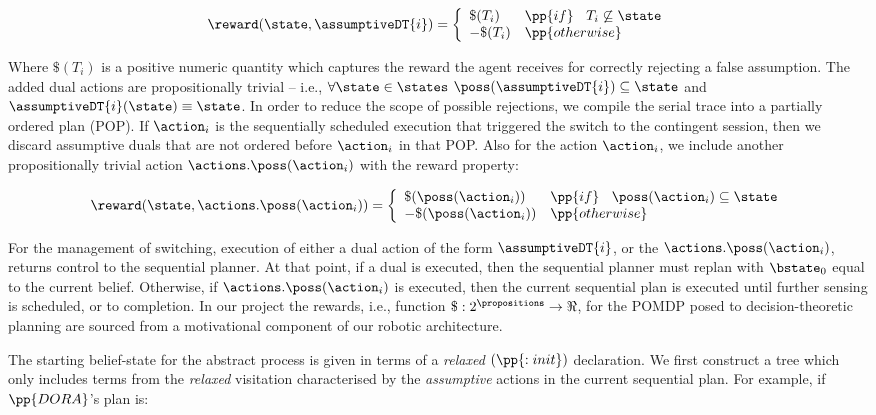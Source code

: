 \[
\reward(\state, \assumptiveDT{i}) = \bigg\{ \begin{array}{ll}
\$(T_i) & \pp{if}~\;\;T_i \not\subseteq \state \\
-\$(T_i) & \pp{otherwise} \\
\end{array}
\]

\noindent Where $\$(T_i)$ is a positive numeric quantity which
captures the reward the agent receives for correctly rejecting a
false assumption. The added dual actions are propositionally trivial
-- i.e., $\forall\state\in\states$ $\poss(\assumptiveDT{i})
\subseteq \state$ and $\assumptiveDT{i}(\state) \equiv \state$.  
In order to reduce the scope of possible rejections, we compile the
serial trace into a partially ordered plan (POP). If $\action_i$ is
the sequentially scheduled execution that triggered the switch to the
contingent session, then we discard assumptive duals that are not
ordered before $\action_i$ in that POP.
Also for the action $\action_i$, we include another propositionally
trivial action $\actions.\poss(\action_i)$ with the reward property:

\[
\reward(\state, \actions.\poss(\action_i)) = \bigg\{ \begin{array}{ll}
\$(\poss(\action_i)) & \pp{if}~\;\; \poss(\action_i) \subseteq \state \\
-\$(\poss(\action_i)) & \pp{otherwise} \\
\end{array}
\]


For the management of switching, execution of either a dual action of
the form $\assumptiveDT{i}$, or the $\actions.\poss(\action_i)$,
returns control to the sequential planner. At that point, if a dual is
executed, then the sequential planner must replan with $\bstate_0$
equal to the current belief. Otherwise, if $\actions.\poss(\action_i)$
is executed, then the current sequential plan is executed until
further sensing is scheduled, or to completion. In our project the
rewards, i.e., function $\$:2^\propositions\to\Re$, for the POMDP
posed to decision-theoretic planning are sourced from a motivational
component of our robotic architecture.

The starting belief-state for the abstract process is given in terms
of a {\em relaxed} $(\pp{:init})$ declaration.  We first construct a
tree which only includes terms from the {\em relaxed} visitation
characterised by the {\em assumptive} actions in the current
sequential plan. For example, if $\pp{DORA}$'s plan is:

